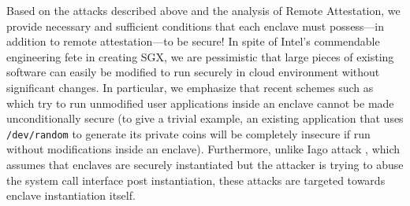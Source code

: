 \documentclass[11pt]{article}
\begin{document}
    Based on the attacks described above and the analysis of Remote
    Attestation, we provide necessary and sufficient conditions that
    each enclave must possess---in addition to remote attestation---to
    be secure! In spite of Intel's commendable engineering fete in
    creating SGX, we are pessimistic that large pieces of existing
    software can easily be modified to run securely in cloud
    environment without significant changes. In particular, we
    emphasize that recent schemes such as \cite{Haven, Graphene,
      Scone} which try to run unmodified user applications inside an
    enclave cannot be made unconditionally secure (to give a trivial
    example, an existing application that uses \texttt{/dev/random} to
    generate its private coins will be completely insecure if run
    without modifications inside an enclave). Furthermore, unlike Iago
    attack \cite{iago}, which assumes that enclaves are securely
    instantiated but the attacker is trying to abuse the system call
    interface post instantiation, these attacks are targeted towards
    enclave instantiation itself.



\end{document}
